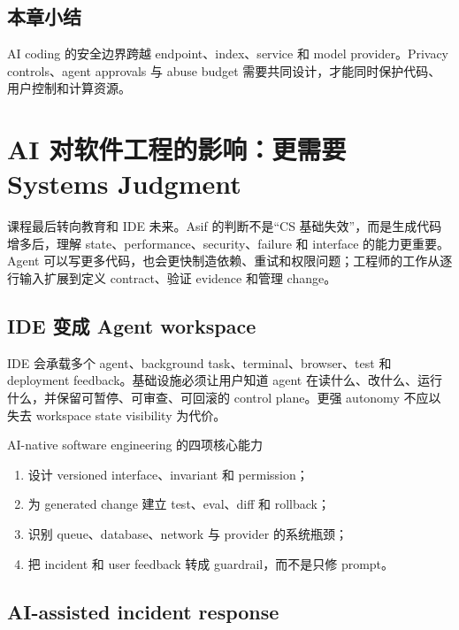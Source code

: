 \documentclass[a4paper]{article}
\begin{document}

\subsection{本章小结}

AI coding 的安全边界跨越 endpoint、index、service 和 model provider。Privacy controls、agent approvals 与 abuse budget 需要共同设计，才能同时保护代码、用户控制和计算资源。

\section{AI 对软件工程的影响：更需要 Systems Judgment}

课程最后转向教育和 IDE 未来。Asif 的判断不是“CS 基础失效”，而是生成代码增多后，理解 state、performance、security、failure 和 interface 的能力更重要。Agent 可以写更多代码，也会更快制造依赖、重试和权限问题；工程师的工作从逐行输入扩展到定义 contract、验证 evidence 和管理 change。

\subsection{IDE 变成 Agent workspace}

IDE 会承载多个 agent、background task、terminal、browser、test 和 deployment feedback。基础设施必须让用户知道 agent 在读什么、改什么、运行什么，并保留可暂停、可审查、可回滚的 control plane。更强 autonomy 不应以失去 workspace state visibility 为代价。

\begin{importantbox}{AI-native software engineering 的四项核心能力}
\begin{enumerate}
  \item 设计 versioned interface、invariant 和 permission；
  \item 为 generated change 建立 test、eval、diff 和 rollback；
  \item 识别 queue、database、network 与 provider 的系统瓶颈；
  \item 把 incident 和 user feedback 转成 guardrail，而不是只修 prompt。
\end{enumerate}
\end{importantbox}

\subsection{AI-assisted incident response}
\end{document}
